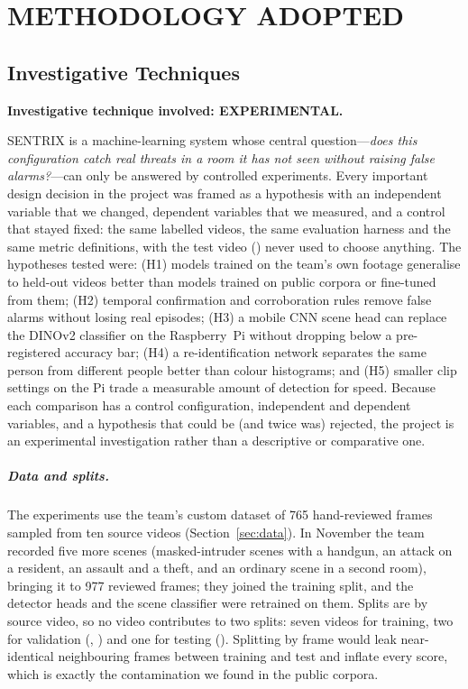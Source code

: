 \chapter{METHODOLOGY ADOPTED}
\label{ch:method}

\section{Investigative Techniques}
\label{sec:investigative}

\textbf{Investigative technique involved: EXPERIMENTAL.}

SENTRIX is a machine-learning system whose central question---\emph{does this configuration catch real threats in a room it has not seen without raising false alarms?}---can only be answered by controlled experiments. Every important design decision in the project was framed as a hypothesis with an independent variable that we changed, dependent variables that we measured, and a control that stayed fixed: the same labelled videos, the same evaluation harness and the same metric definitions, with the test video () never used to choose anything. The hypotheses tested were: (H1) models trained on the team's own footage generalise to held-out videos better than models trained on public corpora or fine-tuned from them; (H2) temporal confirmation and corroboration rules remove false alarms without losing real episodes; (H3) a mobile CNN scene head can replace the DINOv2 classifier on the Raspberry~Pi without dropping below a pre-registered accuracy bar; (H4) a re-identification network separates the same person from different people better than colour histograms; and (H5) smaller clip settings on the Pi trade a measurable amount of detection for speed. Because each comparison has a control configuration, independent and dependent variables, and a hypothesis that could be (and twice was) rejected, the project is an experimental investigation rather than a descriptive or comparative one.

\paragraph{Data and splits.} The experiments use the team's custom dataset of 765 hand-reviewed frames sampled from ten source videos (Section~\ref{sec:data}). In November the team recorded five more scenes (masked-intruder scenes with a handgun, an attack on a resident, an assault and a theft, and an ordinary scene in a second room), bringing it to 977 reviewed frames; they joined the training split, and the detector heads and the scene classifier were retrained on them. Splits are by source video, so no video contributes to two splits: seven videos for training, two for validation (, ) and one for testing (). Splitting by frame would leak near-identical neighbouring frames between training and test and inflate every score, which is exactly the contamination we found in the public corpora.

